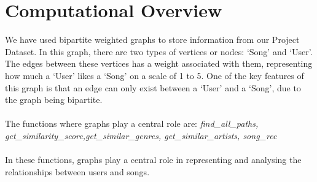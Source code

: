 \documentclass[fontsize=11pt]{article}
\begin{document}
\section*{Computational Overview}

We have used bipartite weighted graphs to store information from our Project Dataset. In this graph, there are two types of vertices or nodes: ‘Song’ and ‘User’. The edges between these vertices has a weight associated with them, representing how much a ‘User’ likes a ‘Song’ on a scale of 1 to 5. One of the key features of this graph is that an edge can only exist between a ‘User’ and a ‘Song’, due to the graph being bipartite. 
\\\\
The functions where graphs play a central role are: \textit{find\_all\_paths, get\_similarity\_score,get\_similar\_genres, get\_similar\_artists, song\_rec}
\\\\
In these functions, graphs play a central role in representing and analysing the relationships between users and songs.
\end{document}
